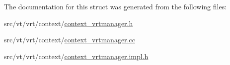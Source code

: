 The documentation for this struct was generated from the following files\+:\begin{DoxyCompactItemize}
\item 
src/vt/vrt/context/\hyperlink{context__vrtmanager_8h}{context\+\_\+vrtmanager.\+h}\item 
src/vt/vrt/context/\hyperlink{context__vrtmanager_8cc}{context\+\_\+vrtmanager.\+cc}\item 
src/vt/vrt/context/\hyperlink{context__vrtmanager_8impl_8h}{context\+\_\+vrtmanager.\+impl.\+h}\end{DoxyCompactItemize}
